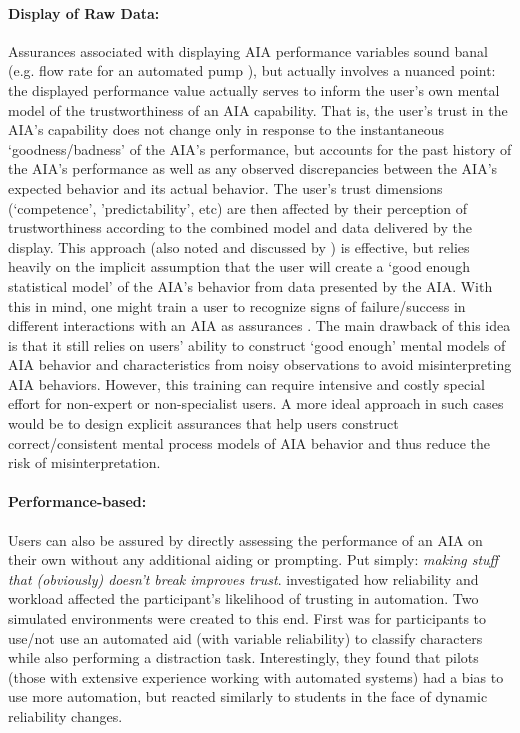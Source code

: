 \paragraph{Display of Raw Data:}
Assurances associated with displaying AIA performance variables sound banal (e.g. flow rate for an automated pump \cite{Muir1996-gt}), but actually involves a nuanced point: the displayed performance value actually serves to inform the user's own mental model of the trustworthiness of an AIA capability. That is, the user's trust in the AIA's capability does not change only in response to the instantaneous `goodness/badness' of the AIA's performance, but accounts for the past history of the AIA's performance as well as any observed discrepancies between the AIA's expected behavior and its actual behavior. The user's trust dimensions (`competence', 'predictability', etc) are then affected by their perception of trustworthiness according to the combined model and data delivered by the display. This approach (also noted and discussed by \cite{Wickens1999-la,Sheridan1984-kx,Hutchins2015-if}) is effective, but relies heavily on the implicit assumption that the user will create a `good enough statistical model' of the AIA's behavior from data presented by the AIA. With this in mind, one might train a user to recognize signs of failure/success in different interactions with an AIA as assurances \cite{Freedy2007-sg,Desai2012-rc,Salem2015-md}. The main drawback of this idea is that it still relies on users' ability to construct `good enough' mental models of AIA behavior and characteristics from noisy observations to avoid misinterpreting AIA behaviors. However, this training can require intensive and costly special effort for non-expert or non-specialist users. A more ideal approach in such cases would be to design explicit assurances that help users construct correct/consistent mental process models of AIA behavior and thus reduce the risk of misinterpretation.

\paragraph{Performance-based:}
Users can also be assured by directly assessing the performance of an AIA on their own without any additional aiding or prompting.  Put simply: \emph{making stuff that (obviously) doesn't break improves trust}. \citet{Riley1996-qm} investigated how reliability and workload affected the participant's likelihood of trusting in automation. Two simulated environments were created to this end. First was for participants to use/not use an automated aid (with variable reliability) to classify characters while also performing a distraction task. Interestingly, they found that pilots (those with extensive experience working with automated systems) had a bias to use more automation, but reacted similarly to students in the face of dynamic reliability changes.


